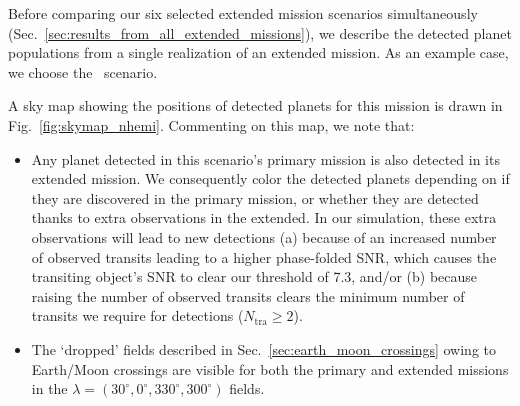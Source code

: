 Before comparing our six selected extended mission scenarios simultaneously (Sec.~\ref{sec:results_from_all_extended_missions}), we describe the detected planet populations from a single realization of an extended mission.
As an example case, we choose the \nhemi\ scenario.

A sky map showing the positions of detected planets for this mission is drawn in Fig.~\ref{fig:skymap_nhemi}.
Commenting on this map, we note that:
\begin{itemize}
	\item Any planet detected in this scenario's primary mission is also detected in its extended mission.
	We consequently color the detected planets depending on if they are discovered in the primary mission, or whether they are detected thanks to extra observations in the extended.
	In our simulation, these extra observations will lead to new detections (a) because of an increased number of observed transits leading to a higher phase-folded SNR, which causes the transiting object's SNR to clear our threshold of 7.3, and/or (b) because raising the number of observed transits clears the minimum number of transits we require for detections ($N_\mathrm{tra} \geq 2$).
	\item The `dropped' fields described in Sec.~\ref{sec:earth_moon_crossings} owing to Earth/Moon crossings are visible for both the primary and extended missions in the $\lambda=(30^\circ, 0^\circ, 330^\circ, 300^\circ)$ fields.
\end{itemize}

